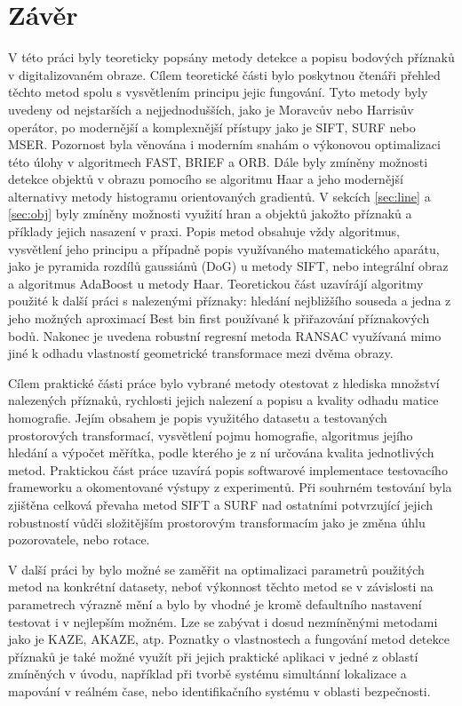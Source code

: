 

\chapter{Závěr}

V této práci byly teoreticky popsány metody detekce a popisu bodových příznaků v digitalizovaném obraze. Cílem teoretické části bylo poskytnou čtenáři přehled těchto metod spolu s vysvětlením principu jejic fungování. Tyto metody byly uvedeny od nejstarších a nejjednodušších, jako je Moravcův nebo Harrisův operátor, po modernější a komplexnější přístupy jako je SIFT, SURF nebo MSER. Pozornost byla věnována i moderním snahám o výkonovou optimalizaci této úlohy v algoritmech FAST, BRIEF a ORB. Dále byly zmíněny možnosti detekce objektů v obrazu pomocího se algoritmu Haar a jeho modernější alternativy metody histogramu orientovaných gradientů. V sekcích \ref{sec:line} a \ref{sec:obj} byly zmíněny možnosti využití hran a objektů jakožto příznaků a příklady jejich nasazení v praxi. Popis metod obsahuje vždy algoritmus, vysvětlení jeho principu a případně popis využívaného matematického aparátu, jako je pyramida rozdílů gaussiánů (DoG) u metody SIFT, nebo integrální obraz a algoritmus AdaBoost u metody Haar. Teoretickou část uzavírájí algoritmy použité k další práci s nalezenými příznaky: hledání nejbližšího souseda a jedna z jeho možných aproximací Best bin first používané k přiřazování příznakových bodů. Nakonec je uvedena robustní regresní metoda RANSAC využívaná mimo jiné k odhadu vlastností geometrické transformace mezi dvěma obrazy.

Cílem praktické části práce bylo vybrané metody otestovat z hlediska množství nalezených příznaků, rychlosti jejich nalezení a popisu a kvality odhadu matice homografie. Jejím obsahem je popis využitého datasetu a testovaných prostorových transformací, vysvětlení pojmu homografie, algoritmus jejího hledání a výpočet měřítka, podle kterého je z ní určována kvalita jednotlivých metod. Praktickou část práce uzavírá popis softwarové implementace testovacího frameworku a okomentované výstupy z experimentů. Při souhrném testování byla zjištěna celková převaha metod SIFT a SURF nad ostatními potvrzující jejich robustností vůdči složitějším prostorovým transformacím jako je změna úhlu pozorovatele, nebo rotace.

V další práci by bylo možné se zaměřit na optimalizaci parametrů použitých metod na konkrétní datasety, neboť výkonnost těchto metod se v závislosti na parametrech výrazně mění a bylo by vhodné je kromě defaultního nastavení testovat i v nejlepším možném. Lze se zabývat i dosud nezmíněnými metodami jako je KAZE, AKAZE, atp. Poznatky o vlastnostech a fungování metod detekce příznaků je také možné využít při jejich praktické aplikaci v jedné z oblastí zmíněných v úvodu, například při tvorbě systému simultánní lokalizace a mapování v reálném čase, nebo identifikačního systému v oblasti bezpečnosti.